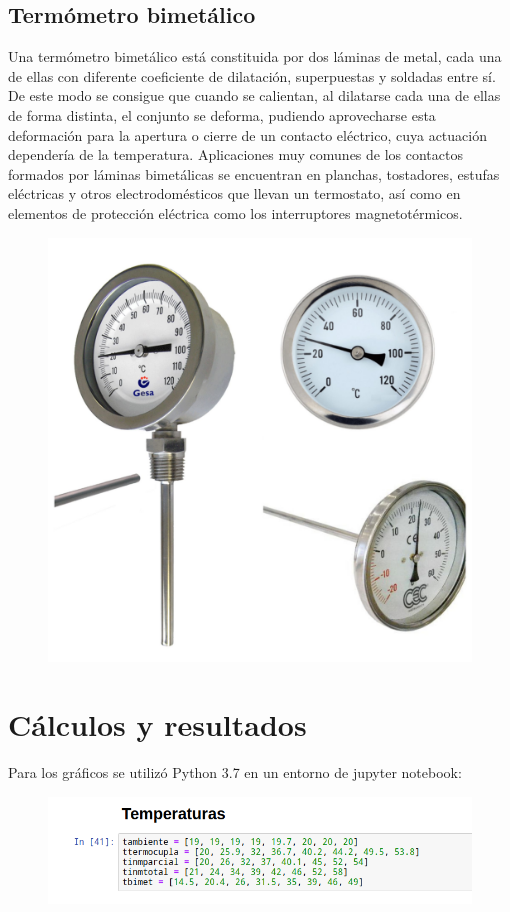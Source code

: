 \documentclass[a4paper,11pt]{report}
\begin{document}
\section{Termómetro bimetálico}
Una termómetro bimetálico está constituida por dos láminas de metal, cada una de ellas con diferente coeficiente de dilatación, superpuestas y soldadas entre sí. De este modo se consigue que cuando se calientan, al dilatarse cada una de ellas de forma distinta, el conjunto se deforma, pudiendo aprovecharse esta deformación para la apertura o cierre de un contacto eléctrico, cuya actuación dependería de la temperatura. Aplicaciones muy comunes de los contactos formados por láminas bimetálicas se encuentran en planchas, tostadores, estufas eléctricas y otros electrodomésticos que llevan un termostato, así como en elementos de protección eléctrica como los interruptores magnetotérmicos.
\begin{figure}[H]
\begin{center}
\includegraphics[scale=0.13]{bimetalico1.jpg}
\end{center}
\end{figure}
\chapter{Cálculos y resultados}
Para los gráficos se utilizó Python 3.7 en un entorno de jupyter notebook:
\begin{figure}[H]
\includegraphics[scale=0.55]{Temperaturas.png}
\end{figure}
\end{document}
